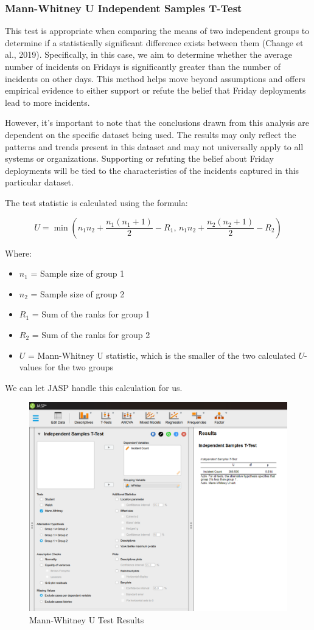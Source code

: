 \documentclass{article}
\begin{document}
\subsubsection{Mann-Whitney U Independent Samples T-Test}

This test is appropriate when comparing the means of two independent groups to determine if a statistically significant difference exists between them (Change et al., 2019). Specifically, in this case, we aim to determine whether the average number of incidents on Fridays is significantly greater than the number of incidents on other days. This method helps move beyond assumptions and offers empirical evidence to either support or refute the belief that Friday deployments lead to more incidents.

 However, it’s important to note that the conclusions drawn from this analysis are dependent on the specific dataset being used. The results may only reflect the patterns and trends present in this dataset and may not universally apply to all systems or organizations. Supporting or refuting the belief about Friday deployments will be tied to the characteristics of the incidents captured in this particular dataset.

 The test statistic is calculated using the formula:

 
\begin{equation}
U = \min \left( n_1 n_2 + \frac{n_1 (n_1 + 1)}{2} - R_1, \, n_1 n_2 + \frac{n_2 (n_2 + 1)}{2} - R_2 \right)
\end{equation}

Where:
\begin{itemize}
    \item $n_1$ = Sample size of group 1
    \item $n_2$ = Sample size of group 2
    \item $R_1$ = Sum of the ranks for group 1
    \item $R_2$ = Sum of the ranks for group 2
    \item $U$ = Mann-Whitney U statistic, which is the smaller of the two calculated \( U \)-values for the two groups
\end{itemize}

We can let JASP handle this calculation for us.

\begin{figure}[H]
    \centering
    \includegraphics[width=0.7\linewidth]{Screenshot 2024-09-28 011601.png}
    \caption{Mann-Whitney U Test Results}
    \label{fig:enter-label}
\end{figure}
\end{document}
